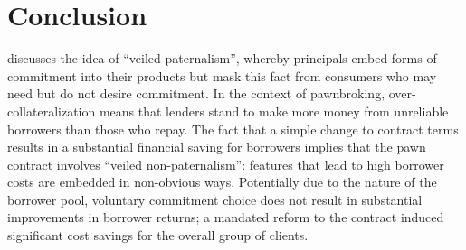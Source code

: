 \documentclass[oneside,11pt]{article}
\begin{document}

    
\section{Conclusion} \label{conclusion}

\cite{Laibson2018} discusses the idea of ``veiled paternalism'', whereby principals embed forms of commitment into their products but mask this fact from consumers who may need but do not desire commitment. In the context of pawnbroking, over-collateralization means that lenders stand to make more money from unreliable borrowers than those who repay.  The fact that a simple change to contract terms results in a substantial financial saving for borrowers implies that the pawn contract involves ``veiled non-paternalism'':   features that lead to high borrower costs are embedded in non-obvious ways.  Potentially due to the nature of the borrower pool, voluntary commitment choice does not result in substantial improvements in borrower returns; a mandated reform to the contract induced significant cost savings for the overall group of clients.  
\end{document}
